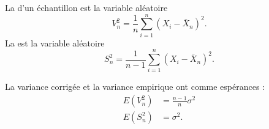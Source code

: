 La  d'un échantillon est la variable aléatoire
\begin{equation}
    V_n^2=\frac{1}{ n }\sum_{i=1}^n(X_i-\bar X_n)^2.
\end{equation}
La  est la variable aléatoire 
\begin{equation}        \label{Eqdefvarempicorri}
    S_n^2=\frac{1}{ n-1 }\sum_{i=1}^n(X_i-\bar X_n)^2.
\end{equation}

\begin{lemma}
    La variance corrigée et la variance empirique ont comme espérances :
    \begin{subequations}
        \begin{align}
            E(V_n^2)&=\frac{ n-1 }{ n }\sigma^2\\
            E(S_n^2)&=\sigma^2.
        \end{align}
    \end{subequations}
\end{lemma}

